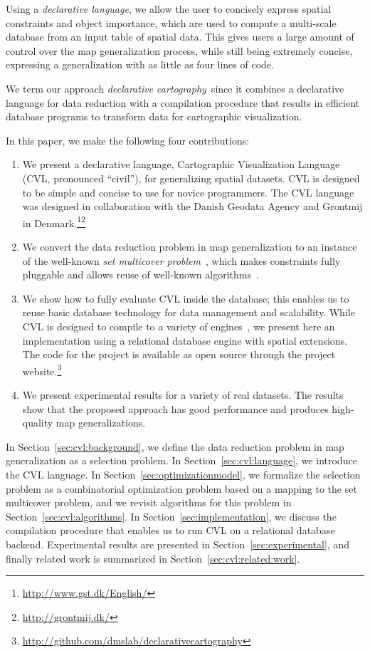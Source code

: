\documentclass[11pt, oneside]{report}
\begin{document}
{Using a \emph{declarative language}, we allow the user to concisely express spatial constraints and object importance, which are used to compute a multi-scale database from an input table of spatial data. This gives users a large amount of control over the map generalization process, while still being extremely concise, expressing a generalization with as little as four lines of code. 

We term our approach \emph{declarative cartography}\, since it combines a declarative language for data reduction with a compilation procedure that results in efficient database programs to transform data for cartographic visualization.

In this paper, we make the following four contributions:
\begin{enumerate}
\item We present a declarative language, Cartographic Visualization Language (CVL, pronounced ``civil''), for generalizing spatial datasets. CVL is designed to be simple and concise to use for novice programmers. The CVL language was designed in collaboration with the Danish Geodata Agency and Grontmij in Denmark.\footnote{\url{http://www.gst.dk/English/}}\footnote{\url{http://grontmij.dk/}}

\item We convert the data reduction problem in map generalization to an instance of the well-known \emph{set multicover problem}~\cite{rajagopalan1998primal}, which makes constraints fully pluggable and allows reuse of well-known algorithms~\cite{rajagopalan1998primal,vazirani2001approximation}.

\item We show how to fully evaluate CVL inside the database; this enables us to reuse basic database technology for data management and scalability. While CVL is designed to compile to a variety of engines~\cite{Stonebraker:2010:PDBMSvsMapReduce}, we present here an implementation using a relational database engine with spatial extensions. The code for the project is available as open source through the project website.\footnote{\url{http://github.com/dmslab/declarativecartography}}

\item We present experimental results for a variety of real datasets. The results show that the proposed approach has good performance and produces high-quality map generalizations.
\end{enumerate}

In Section~\ref{sec:cvl:background}, we define the data reduction problem in map generalization as a selection problem. In Section~\ref{sec:cvl:language}, we introduce the CVL language. In Section~\ref{sec:optimizationmodel}, we formalize the selection problem as a combinatorial optimization problem based on a mapping to the set multicover problem, and we revisit algorithms for this problem in Section~\ref{sec:cvl:algorithms}. In Section~\ref{sec:implementation}, we discuss the compilation procedure that enables us to run CVL on a relational database backend. Experimental results are presented in Section~\ref{sec:experimental}, and finally related work is summarized in Section~\ref{sec:cvl:related:work}.

}
\end{document}
